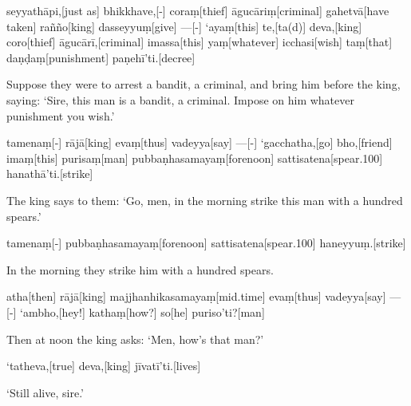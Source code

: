\begin{samepage}
\begingl[glneveryline={\PaliGlossA,\PaliGlossB}]
seyyathāpi,[just as] bhikkhave,[-] coraṃ[thief] āgucāriṃ[criminal] gahetvā[have taken] rañño[king] dasseyyuṃ[give] —[-] ‘ayaṃ[this] te,[ta(d)] deva,[king] coro[thief] āgucārī,[criminal] imassa[this] yaṃ[whatever] icchasi[wish] taṃ[that] daṇḍaṃ[punishment] paṇehī’ti.[decree]
\endgl
\nopagebreak
\linespread{0.5}
\begin{spacin}{0.2}
{\PaliGlossFT Suppose they were to arrest a bandit, a criminal, and bring him before the king, saying: ‘Sire, this man is a bandit, a criminal.  Impose on him whatever punishment you wish.’}
\end{spacin}
\vskip 12pt
\end{samepage}
\begin{samepage}
\begingl[glneveryline={\PaliGlossA,\PaliGlossB}]
tamenaṃ[-] rājā[king] evaṃ[thus] vadeyya[say] —[-] ‘gacchatha,[go] bho,[friend] imaṃ[this] purisaṃ[man] pubbaṇhasamayaṃ[forenoon] sattisatena[spear.100] hanathā’ti.[strike]
\endgl
\nopagebreak
\linespread{0.5}
\begin{spacin}{0.2}
{\PaliGlossFT The king says to them: ‘Go, men, in the morning strike this man with a hundred spears.’}
\end{spacin}
\vskip 12pt
\end{samepage}
\begin{samepage}
\begingl[glneveryline={\PaliGlossA,\PaliGlossB}]
tamenaṃ[-] pubbaṇhasamayaṃ[forenoon] sattisatena[spear.100] haneyyuṃ.[strike]
\endgl
\nopagebreak
\linespread{0.5}
\begin{spacin}{0.2}
{\PaliGlossFT In the morning they strike him with a hundred spears.}
\end{spacin}
\vskip 12pt
\end{samepage}
\begin{samepage}
\begingl[glneveryline={\PaliGlossA,\PaliGlossB}]
atha[then] rājā[king] majjhanhikasamayaṃ[mid.time] evaṃ[thus] vadeyya[say] —[-] ‘ambho,[hey!] kathaṃ[how?] so[he] puriso’ti?[man]
\endgl
\nopagebreak
\linespread{0.5}
\begin{spacin}{0.2}
{\PaliGlossFT Then at noon the king asks: ‘Men, how’s that man?’}
\end{spacin}
\vskip 12pt
\end{samepage}
\begin{samepage}
\begingl[glneveryline={\PaliGlossA,\PaliGlossB}]
‘tatheva,[true] deva,[king] jīvatī’ti.[lives]
\endgl
\nopagebreak
\linespread{0.5}
\begin{spacin}{0.2}
{\PaliGlossFT ‘Still alive, sire.’}
\end{spacin}
\vskip 12pt
\end{samepage}
